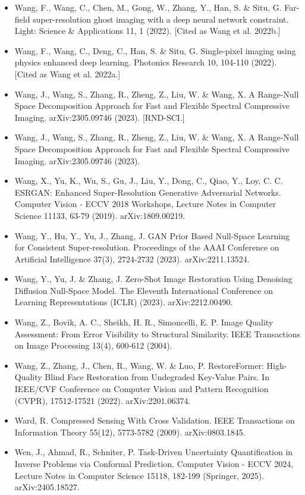 \documentclass[11pt]{article}
\begin{document}
\begin{itemize}
\item Wang, F., Wang, C., Chen, M., Gong, W., Zhang, Y., Han, S. \& Situ, G. Far-field super-resolution ghost imaging with a deep neural network constraint. Light: Science \& Applications 11, 1 (2022). [Cited as Wang et al. 2022b.]
\item Wang, F., Wang, C., Deng, C., Han, S. \& Situ, G. Single-pixel imaging using physics enhanced deep learning. Photonics Research 10, 104-110 (2022). [Cited as Wang et al. 2022a.]
\item Wang, J., Wang, S., Zhang, R., Zheng, Z., Liu, W. \& Wang, X. A Range-Null Space Decomposition Approach for Fast and Flexible Spectral Compressive Imaging. arXiv:2305.09746 (2023). [RND-SCI.]
\item Wang, J., Wang, S., Zhang, R., Zheng, Z., Liu, W. \& Wang, X. A Range-Null Space Decomposition Approach for Fast and Flexible Spectral Compressive Imaging. arXiv:2305.09746 (2023).
\item Wang, X., Yu, K., Wu, S., Gu, J., Liu, Y., Dong, C., Qiao, Y., Loy, C. C. ESRGAN: Enhanced Super-Resolution Generative Adversarial Networks. Computer Vision - ECCV 2018 Workshops, Lecture Notes in Computer Science 11133, 63-79 (2019). arXiv:1809.00219.
\item Wang, Y., Hu, Y., Yu, J., Zhang, J. GAN Prior Based Null-Space Learning for Consistent Super-resolution. Proceedings of the AAAI Conference on Artificial Intelligence 37(3), 2724-2732 (2023). arXiv:2211.13524.
\item Wang, Y., Yu, J. \& Zhang, J. Zero-Shot Image Restoration Using Denoising Diffusion Null-Space Model. The Eleventh International Conference on Learning Representations (ICLR) (2023). arXiv:2212.00490.
\item Wang, Z., Bovik, A. C., Sheikh, H. R., Simoncelli, E. P. Image Quality Assessment: From Error Visibility to Structural Similarity. IEEE Transactions on Image Processing 13(4), 600-612 (2004).
\item Wang, Z., Zhang, J., Chen, R., Wang, W. \& Luo, P. RestoreFormer: High-Quality Blind Face Restoration from Undegraded Key-Value Pairs. In IEEE/CVF Conference on Computer Vision and Pattern Recognition (CVPR), 17512-17521 (2022). arXiv:2201.06374.
\item Ward, R. Compressed Sensing With Cross Validation. IEEE Transactions on Information Theory 55(12), 5773-5782 (2009). arXiv:0803.1845.
\item Wen, J., Ahmad, R., Schniter, P. Task-Driven Uncertainty Quantification in Inverse Problems via Conformal Prediction. Computer Vision - ECCV 2024, Lecture Notes in Computer Science 15118, 182-199 (Springer, 2025). arXiv:2405.18527.

\end{itemize}
\end{document}
